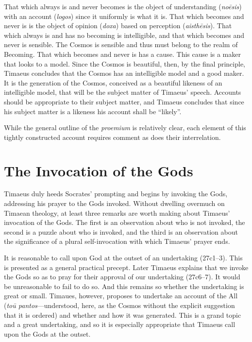 That which always is and never becomes is the object of understanding (\emph{noēsis}) with an account (\emph{logos}) since it uniformly is what it is. That which becomes and never is is the object of opinion (\emph{doxa}) based on perception (\emph{aisthēsis}). That which always is and has no becoming is intelligible, and that which becomes and never is sensible. The Cosmos is sensible and thus must belong to the realm of Becoming. That which becomes and never is has a cause. This cause is a maker that looks to a model. Since the Cosmos is beautiful, then, by the final principle, Timaeus concludes that the Cosmos has an intelligible model and a good maker. It is the generation of the Cosmos, conceived as a beautiful likeness of an intelligible model, that will be the subject matter of Timaeus' speech. Accounts should be appropriate to their subject matter, and Timaeus concludes that since his subject matter is a likeness his account shall be ``likely''.

While the general outline of the \emph{proemium} is relatively clear, each element of this tightly constructed account requires comment as does their interrelation. 


\section{The Invocation of the Gods} %
\label{sec:the_invocation_of_the_gods}

Timaeus duly heeds Socrates' prompting and begins by invoking the Gods, addressing his prayer to the Gods invoked. Without dwelling overmuch on Timaean theology, at least three remarks are worth making about Timae\-us' invocation of the Gods. The first is an observation about who is not invoked, the second is a puzzle about who is invoked, and the third is an observation about the significance of a plural self-invocation with which Timaeus' prayer ends.

It is reasonable to call upon God at the outset of an undertaking (27c1--3). This is presented as a general practical precept. Later Timaeus explains that we invoke the Gods so as to pray for their approval of our undertaking (27c6--7). It would be unreasonable to fail to do so. And this remains so whether the undertaking is great or small. Timaues, however, proposes to undertake an account of the All (\emph{toū pantos}---understood, here, as the Cosmos without the explicit suggestion that it is ordered) and whether and how it was generated. This is a grand topic and a great undertaking, and so it is especially appropriate that Timaeus call upon the Gods at the outset.

